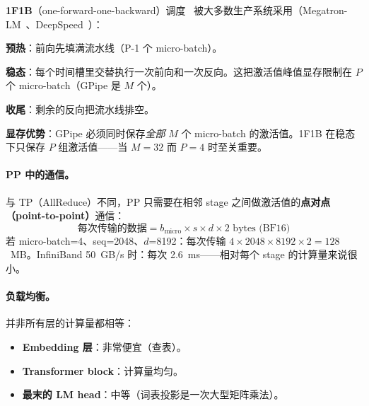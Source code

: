 \begin{intuitionbox}[1F1B：生产标准]
\textbf{1F1B}（one-forward-one-backward）调度~\cite{narayanan2019pipedream} 被大多数生产系统采用（Megatron-LM~\cite{narayanan2021efficient}、DeepSpeed~\cite{rajbhandari2020zero}）：

\textbf{预热}：前向先填满流水线（P-1 个 micro-batch）。

\textbf{稳态}：每个时间槽里交替执行一次前向和一次反向。这把激活值峰值显存限制在 $P$ 个 micro-batch（GPipe 是 $M$ 个）。

\textbf{收尾}：剩余的反向把流水线排空。

\textbf{显存优势}：GPipe 必须同时保存\emph{全部} $M$ 个 micro-batch 的激活值。1F1B 在稳态下只保存 $P$ 组激活值——当 $M = 32$ 而 $P = 4$ 时至关重要。
\end{intuitionbox}

\paragraph{PP 中的通信。}
\label{communication-in-pp.}

与 TP（AllReduce）不同，PP 只需要在相邻 stage 之间做激活值的\textbf{点对点（point-to-point）}通信：
\begin{equation}
\text{每次传输的数据} = b_\text{micro} \times s \times d \times 2\text{ bytes (BF16)}
\end{equation}
若 micro-batch=4、seq=2048、$d$=8192：每次传输 $4 \times 2048 \times 8192 \times 2 = 128$~MB。InfiniBand 50~GB/s 时：每次 2.6~ms——相对每个 stage 的计算量来说很小。

\paragraph{负载均衡。}
\label{load-balancing.}

并非所有层的计算量都相等：

\begin{itemize}
  \item \textbf{Embedding 层}：非常便宜（查表）。
  \item \textbf{Transformer block}：计算量均匀。
  \item \textbf{最末的 LM head}：中等（词表投影是一次大型矩阵乘法）。
\end{itemize}


